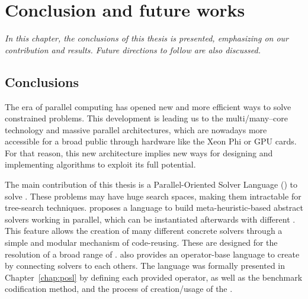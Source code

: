 \chapter{Conclusion and future works}
\label{chap:conclusion}
\textit{In this chapter, the conclusions of this thesis is presented, emphasizing on our contribution and results. Future directions to follow are also discussed.}
\vfill
\minitoc
\newpage

\section{Conclusions}
\label{sec:conclusion_conclusion}

The era of parallel computing has opened new and more efficient ways to solve constrained problems. This development is leading us to the multi/many--core technology and massive parallel architectures, which are nowadays more accessible for a broad public through hardware like the Xeon Phi or GPU cards. For that reason, this new architecture implies new ways for designing and implementing algorithms to exploit its full potential.

The main contribution of this thesis is a Parallel-Oriented Solver Language (\posl) to solve \CSPs. These problems may have huge search spaces, making them intractable for tree-search techniques. \posl{} proposes a language to build meta-heuristic-based abstract solvers working in parallel, which can be instantiated afterwards with different \bothmodules. This feature allows the creation of many different concrete solvers through a simple and modular mechanism of code-reusing. These \ms{} are designed for the resolution of a broad range of \csps. \posl{} also provides an operator-base language to create \commstrs{} by connecting solvers to each others. The language was formally presented in Chapter~\ref{chap:posl} by defining each provided operator, as well as the benchmark codification method, and the process of creation/usage of the \bothmodules.


